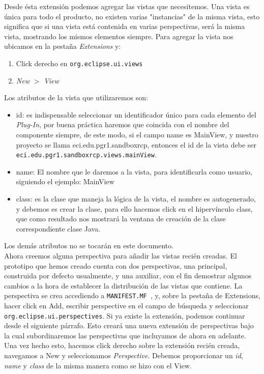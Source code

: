 \documentclass[journal]{IEEEtran}
\newcommand{\mnf}{\texttt{MANIFEST.MF~}}
\begin{document}
Desde ésta extensión podemos agregar las vistas que necesitemos. Una vista es única para todo el producto, no existen varias "instancias" 
de la misma vista, esto significa que si una vista está contenida en varias perspectivas, será la misma vista, mostrando los mismos elementos siempre.
Para agregar la vista nos ubicamos en la pestaña \textit{Extensions} y:
\begin{enumerate}
 \item Click derecho en \texttt{org.eclipse.ui.views} 
 \item \textit{New} $>$ \textit{View}
\end{enumerate}
Los atributos de la vista que utilizaremos son:
\begin{itemize}
 \item id: es indispensable seleccionar un identificador único para cada elemento del \textit{Plug-In}, por buena práctica haremos que coincida 
con el nombre del componente siempre, de este modo, si el campo name es MainView, y nuestro proyecto se llama eci.edu.pgr1.sandboxrcp, 
entonces el id de la vista debe ser \texttt{eci.edu.pgr1.sandboxrcp.views.mainView}.
\item name: El nombre que le daremos a la vista, para identificarla como usuario, siguiendo el ejemplo: MainView
\item class: es la clase que maneja la lógica de la vista, el nombre es autogenerado, y debemos es crear la clase, para ello hacemos 
click en el hipervínculo class, que como resultado nos mostrará la ventana de creación de la clase correspondiente clase Java.
\end{itemize}
Los demás atributos no se tocarán en este documento.
\\
Ahora creemos alguna perspectiva para añadir las vistas recién creadas. El prototipo que hemos creado cuenta con dos perspectivas, una 
principal, construida por defecto usualmente, y una auxiliar, con el fin demostrar algunos cambios a la hora de establecer la distribución 
de las vistas que contiene.
La perspectiva se crea accediendo a \mnf, y, sobre la pestaña de Extensions, hacer click en Add, escribir perspective en el campo de búsqueda 
y seleccionar \texttt{org.eclipse.ui.perspectives}. Si ya existe la extensión, podemos continuar desde el siguiente párrafo. Esto creará una nueva extensión 
de perspectivas bajo la cual subordinaremos las perspectivas que incluyamos de ahora en adelante.
Una vez hecho esto, hacemos click derecho sobre la extensión recién creada, navegamos a New y seleccionamos \textit{Perspective}. Debemos proporcionar un \textit{id}, 
\textit{name} y \textit{class} de la misma manera como se hizo con el View.
\end{document}
